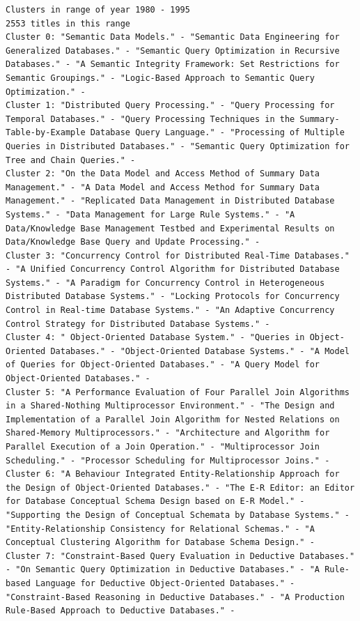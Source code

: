 \documentclass[a4paper,fontsize=11pt]{article}
\begin{document}
\begin{lstlisting}[caption={KMeans output},label={lst:output},breaklines]
Clusters in range of year 1980 - 1995
2553 titles in this range
Cluster 0: "Semantic Data Models." - "Semantic Data Engineering for Generalized Databases." - "Semantic Query Optimization in Recursive Databases." - "A Semantic Integrity Framework: Set Restrictions for Semantic Groupings." - "Logic-Based Approach to Semantic Query Optimization." - 
Cluster 1: "Distributed Query Processing." - "Query Processing for Temporal Databases." - "Query Processing Techniques in the Summary-Table-by-Example Database Query Language." - "Processing of Multiple Queries in Distributed Databases." - "Semantic Query Optimization for Tree and Chain Queries." - 
Cluster 2: "On the Data Model and Access Method of Summary Data Management." - "A Data Model and Access Method for Summary Data Management." - "Replicated Data Management in Distributed Database Systems." - "Data Management for Large Rule Systems." - "A Data/Knowledge Base Management Testbed and Experimental Results on Data/Knowledge Base Query and Update Processing." - 
Cluster 3: "Concurrency Control for Distributed Real-Time Databases." - "A Unified Concurrency Control Algorithm for Distributed Database Systems." - "A Paradigm for Concurrency Control in Heterogeneous Distributed Database Systems." - "Locking Protocols for Concurrency Control in Real-time Database Systems." - "An Adaptive Concurrency Control Strategy for Distributed Database Systems." - 
Cluster 4: " Object-Oriented Database System." - "Queries in Object-Oriented Databases." - "Object-Oriented Database Systems." - "A Model of Queries for Object-Oriented Databases." - "A Query Model for Object-Oriented Databases." - 
Cluster 5: "A Performance Evaluation of Four Parallel Join Algorithms in a Shared-Nothing Multiprocessor Environment." - "The Design and Implementation of a Parallel Join Algorithm for Nested Relations on Shared-Memory Multiprocessors." - "Architecture and Algorithm for Parallel Execution of a Join Operation." - "Multiprocessor Join Scheduling." - "Processor Scheduling for Multiprocessor Joins." - 
Cluster 6: "A Behaviour Integrated Entity-Relationship Approach for the Design of Object-Oriented Databases." - "The E-R Editor: an Editor for Database Conceptual Schema Design based on E-R Model." - "Supporting the Design of Conceptual Schemata by Database Systems." - "Entity-Relationship Consistency for Relational Schemas." - "A Conceptual Clustering Algorithm for Database Schema Design." - 
Cluster 7: "Constraint-Based Query Evaluation in Deductive Databases." - "On Semantic Query Optimization in Deductive Databases." - "A Rule-based Language for Deductive Object-Oriented Databases." - "Constraint-Based Reasoning in Deductive Databases." - "A Production Rule-Based Approach to Deductive Databases." - 

\end{lstlisting}
\end{document}
